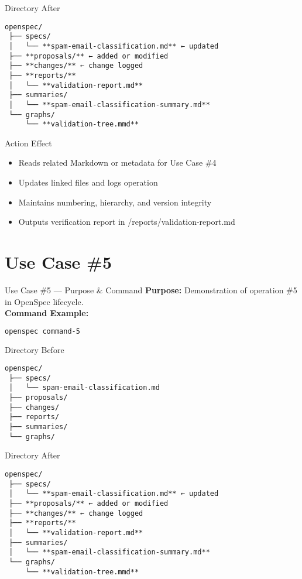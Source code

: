 \documentclass[aspectratio=169]{beamer}
\begin{document}
\begin{frame}{Directory After}
\begin{lstlisting}
openspec/
 ├── specs/
 │   └── **spam-email-classification.md** ← updated
 ├── **proposals/** ← added or modified
 ├── **changes/** ← change logged
 ├── **reports/**
 │   └── **validation-report.md**
 ├── summaries/
 │   └── **spam-email-classification-summary.md**
 └── graphs/
     └── **validation-tree.mmd**
\end{lstlisting}
\end{frame}

\begin{frame}{Action Effect}
\begin{itemize}
  \item Reads related Markdown or metadata for Use Case \#4
  \item Updates linked files and logs operation
  \item Maintains numbering, hierarchy, and version integrity
  \item Outputs verification report in /reports/validation-report.md
\end{itemize}
\end{frame}

\section*{Use Case \#5}
\begin{frame}{Use Case \#5 --- Purpose \& Command}
\textbf{Purpose:} Demonstration of operation \#5 in OpenSpec lifecycle.\\[4pt]
\textbf{Command Example:}
\begin{lstlisting}[language=bash]
openspec command-5
\end{lstlisting}
\end{frame}

\begin{frame}{Directory Before}
\begin{lstlisting}
openspec/
 ├── specs/
 │   └── spam-email-classification.md
 ├── proposals/
 ├── changes/
 ├── reports/
 ├── summaries/
 └── graphs/
\end{lstlisting}
\end{frame}

\begin{frame}{Directory After}
\begin{lstlisting}
openspec/
 ├── specs/
 │   └── **spam-email-classification.md** ← updated
 ├── **proposals/** ← added or modified
 ├── **changes/** ← change logged
 ├── **reports/**
 │   └── **validation-report.md**
 ├── summaries/
 │   └── **spam-email-classification-summary.md**
 └── graphs/
     └── **validation-tree.mmd**
\end{lstlisting}
\end{frame}
\end{document}

